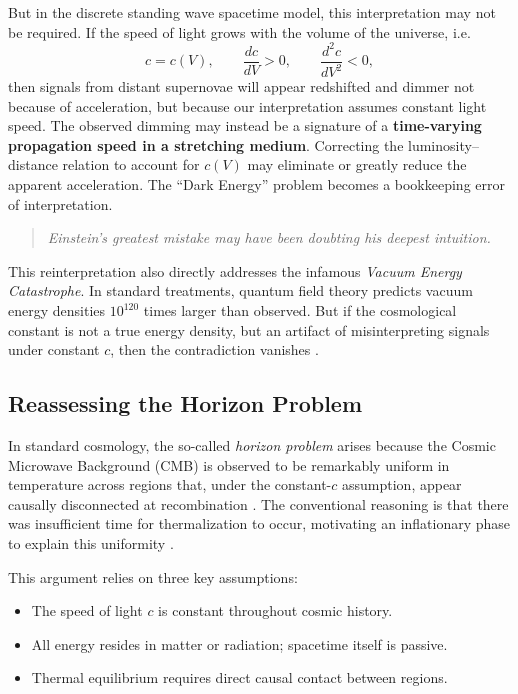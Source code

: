 \documentclass[12pt]{article}
\begin{document}
But in the discrete standing wave spacetime model, this interpretation may not be required. If the speed of light grows with the volume of the universe, i.e.
\begin{equation}
  c = c(V), \qquad \frac{dc}{dV} > 0, \qquad \frac{d^2c}{dV^2} < 0,
\end{equation}
then signals from distant supernovae will appear redshifted and dimmer not because of acceleration, but because our interpretation assumes constant light speed. The observed dimming may instead be a signature of a \textbf{time-varying propagation speed in a stretching medium}. Correcting the luminosity–distance relation to account for \(c(V)\) may eliminate or greatly reduce the apparent acceleration. The ``Dark Energy'' problem becomes a bookkeeping error of interpretation.

\begin{quote}
\textit{Einstein’s greatest mistake may have been doubting his deepest intuition.}
\end{quote}

This reinterpretation also directly addresses the infamous \textit{Vacuum Energy Catastrophe}. In standard treatments, quantum field theory predicts vacuum energy densities \(10^{120}\) times larger than observed. But if the cosmological constant is not a true energy density, but an artifact of misinterpreting signals under constant \(c\), then the contradiction vanishes \citep{weinberg1989}.

\subsection{Reassessing the Horizon Problem}

In standard cosmology, the so-called \emph{horizon problem} arises because the Cosmic Microwave Background (CMB) is observed to be remarkably uniform in temperature across regions that, under the constant-$c$ assumption, appear causally disconnected at recombination \cite{smoot1992}. The conventional reasoning is that there was insufficient time for thermalization to occur, motivating an inflationary phase to explain this uniformity \cite{liddle2000}.

This argument relies on three key assumptions:
\begin{itemize}
\item The speed of light \(c\) is constant throughout cosmic history.
\item All energy resides in matter or radiation; spacetime itself is passive.
\item Thermal equilibrium requires direct causal contact between regions.
\end{itemize}
\end{document}

